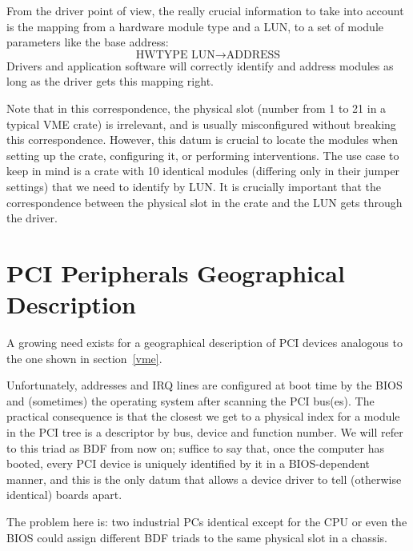 \documentclass[a4paper]{article}
\begin{document}
From the driver point of view, the really crucial information to take
into account is the mapping from a hardware module type and a LUN, to a
set of module parameters like the base address:
\begin{equation*}
\text{HWTYPE LUN} \to \text{ADDRESS}
\end{equation*}
Drivers and application software will correctly identify and address
modules as long as the driver gets this mapping right.

Note that in this correspondence, the physical slot (number from 1 to
21 in a typical VME crate) is irrelevant, and is usually misconfigured
without breaking this correspondence. However, this datum is crucial to
locate the modules when setting up the crate, configuring it, or
performing interventions. The use case to keep in mind is a crate with
10 identical modules (differing only in their jumper settings) that we
need to identify by LUN. It is crucially important that the
correspondence between the physical slot in the crate and the LUN gets
through the driver.

\section{PCI Peripherals Geographical Description}
\label{pci}

A growing need exists for a geographical description of PCI devices
analogous to the one shown in section~\ref{vme}.

Unfortunately, addresses and IRQ lines are configured
at boot time by the BIOS and (sometimes) the operating
system after scanning the PCI bus(es).
The practical consequence is that the closest we get to a
physical index for a module in the PCI tree is a descriptor by bus,
device and function number. We will refer to this triad as BDF from now
on; suffice to say that, once the computer has booted, every PCI device
is uniquely identified by it in a BIOS-dependent manner, and this is the
only datum that allows a device driver to tell (otherwise identical)
boards apart.

The problem here is: two industrial PCs identical except for the CPU or
even the BIOS could assign different BDF triads to the same physical
slot in a chassis.
\end{document}
